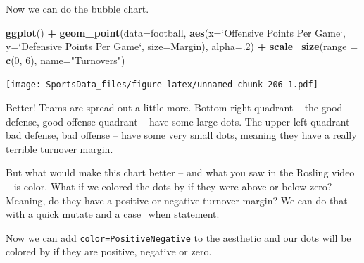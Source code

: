 \documentclass[]{book}
\newenvironment{Shaded}{\begin{snugshade}}{\end{snugshade}}
\newcommand{\DataTypeTok}[1]{\textcolor[rgb]{0.13,0.29,0.53}{#1}}
\newcommand{\DecValTok}[1]{\textcolor[rgb]{0.00,0.00,0.81}{#1}}
\newcommand{\KeywordTok}[1]{\textcolor[rgb]{0.13,0.29,0.53}{\textbf{#1}}}
\newcommand{\NormalTok}[1]{#1}
\newcommand{\OperatorTok}[1]{\textcolor[rgb]{0.81,0.36,0.00}{\textbf{#1}}}
\newcommand{\StringTok}[1]{\textcolor[rgb]{0.31,0.60,0.02}{#1}}
\begin{document}
Now we can do the bubble chart.

\begin{Shaded}
\begin{Highlighting}[]
\KeywordTok{ggplot}\NormalTok{() }\OperatorTok{+}\StringTok{ }\KeywordTok{geom_point}\NormalTok{(}\DataTypeTok{data=}\NormalTok{football, }\KeywordTok{aes}\NormalTok{(}\DataTypeTok{x=}\StringTok{`}\DataTypeTok{Offensive Points Per Game}\StringTok{`}\NormalTok{, }\DataTypeTok{y=}\StringTok{`}\DataTypeTok{Defensive Points Per Game}\StringTok{`}\NormalTok{, }\DataTypeTok{size=}\NormalTok{Margin), }\DataTypeTok{alpha=}\NormalTok{.}\DecValTok{2}\NormalTok{) }\OperatorTok{+}\StringTok{ }\KeywordTok{scale_size}\NormalTok{(}\DataTypeTok{range =} \KeywordTok{c}\NormalTok{(}\DecValTok{0}\NormalTok{, }\DecValTok{6}\NormalTok{), }\DataTypeTok{name=}\StringTok{"Turnovers"}\NormalTok{)}
\end{Highlighting}
\end{Shaded}

\texttt{[image: SportsData\_files/figure-latex/unnamed-chunk-206-1.pdf]}

Better! Teams are spread out a little more. Bottom right quadrant -- the good defense, good offense quadrant -- have some large dots. The upper left quadrant -- bad defense, bad offense -- have some very small dots, meaning they have a really terrible turnover margin.

But what would make this chart better -- and what you saw in the Rosling video -- is color. What if we colored the dots by if they were above or below zero? Meaning, do they have a positive or negative turnover margin? We can do that with a quick mutate and a case\_when statement.

\begin{Shaded}
\end{Shaded}

Now we can add \texttt{color=PositiveNegative} to the aesthetic and our dots will be colored by if they are positive, negative or zero.
\end{document}
